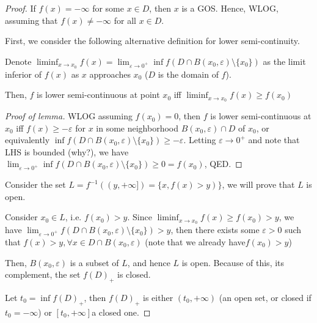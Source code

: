 \begin{proof}

  If \( f(x) = -\infty \) for some \( x \in D \), then \( x \) is a GOS. Hence,
  WLOG, assuming that \( f(x) \neq  -\infty \) for all \( x \in D \).

  First, we consider the following alternative definition for lower
  semi-continuity.

\begin{lemma}
  Denote \( \liminf_{x \to  x_{0}} f(x) = \lim_{\varepsilon \to 0^{+}} \inf f(D \cap
  B(x_{0}, \varepsilon) \setminus \{x_{0}\})    \) as the limit inferior of \(
  f(x) \) as \( x \) approaches \( x_{0} \) (\( D \) is the domain of \( f \)).
  
  Then, \( f \) is lower semi-continuous at point \( x_{0} \) iff \( \liminf_{x \to
  x_{0}} f(x) \ge  f(x_{0}) \)
\end{lemma}

\begin{proof}[Proof of lemma]
  WLOG assuming \( f(x_{0})=0 \), then \( f \) is lower semi-continuous at \(
  x_{0} \) iff \( f(x)\ge -\varepsilon \) for \( x \) in some neighborhood \(
  B(x_{0}, \varepsilon) \cap D \) of \( x_{0} \), or equivalently \( \inf
  f(D \cap B(x_{0}, \varepsilon) \setminus \{x_{0}\}  ) \ge -\varepsilon \).
  Letting \( \varepsilon \to  0^{+} \) and note that LHS is bounded (why?), we
  have \( \lim_{\varepsilon\to  0^{+}} \inf f(D \cap  B(x_{0}, \varepsilon)
  \setminus \{x_{0}\}  ) \ge  0 = f(x_{0}) \), QED.
\end{proof}

Consider the set \( L = f^{-1}((y, +\infty]) = \{x, f(x) > y)\}   \), we will prove
that \( L \) is open.

Consider \( x_{0} \in L \), i.e. \( f(x_{0}) > y \). Since \( \liminf_{x \to
x_{0}} f(x) \ge f(x_{0}) > y \), we have \( \lim_{\varepsilon \to  0^{+}} f(D
\cap B(x_{0}, \varepsilon) \setminus \{x_{0}\}) > y   \), then there exists some
\( \varepsilon > 0 \) such that \( f(x) > y, \forall x \in D \cap B(x_{0},
\varepsilon) \) (note that we already have\( f(x_{0}) > y \))

Then, \( B(x_{0}, \varepsilon) \) is a subset of \( L \), and hence \( L \) is
open. Because of this, its complement, the set \( f(D)_{+} \) is closed.

Let \( t_{0} = \inf f(D)_{+} \), then \( f(D)_{+} \) is either \( (t_{0},
+\infty) \) (an open set, or closed if \( t_{0} = -\infty \)) or \( [t_{0},
+\infty] \)a closed one.


\end{proof}
